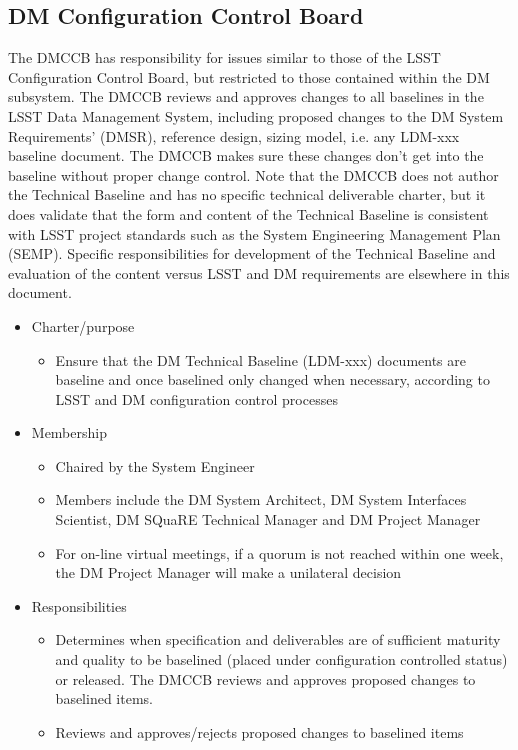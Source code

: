 \subsection{DM Configuration Control Board \label{sect:tct}}
The DMCCB has responsibility for issues similar to those of the LSST Configuration Control Board, but restricted to those contained within the DM subsystem. The DMCCB reviews and approves changes to all baselines in the LSST Data Management System, including proposed changes to the DM System Requirements' (DMSR), reference design, sizing model, i.e. any LDM-xxx baseline document.  The DMCCB makes sure these changes don't get into the baseline without proper change control.  Note that the DMCCB does not author the Technical Baseline and has no specific technical deliverable charter, but it does validate that the form and content of the Technical Baseline is consistent with LSST project standards such as the System Engineering Management Plan (SEMP).  Specific responsibilities for development of the Technical Baseline and evaluation of the content versus LSST and DM requirements are elsewhere in this document.
\begin{itemize}
\item Charter/purpose
	\begin{itemize}
	\item Ensure that the DM Technical Baseline (LDM-xxx) documents are baseline and once baselined only changed when necessary, according to LSST and DM configuration control processes
	\end{itemize}
\item Membership
	\begin{itemize}
	\item Chaired by the System Engineer
	\item Members include the DM System Architect, DM System Interfaces Scientist, DM SQuaRE Technical Manager and DM Project Manager
	\item For on-line virtual meetings, if a quorum is not reached within one week, the DM Project Manager will make a unilateral decision
	\end{itemize}
\item Responsibilities
	\begin{itemize}
	\item Determines when specification and deliverables are of sufficient maturity and quality to be baselined (placed under configuration controlled status) or released. The DMCCB reviews and approves proposed changes to baselined items.
	\item Reviews and approves/rejects proposed changes to baselined items
	\end{itemize}
\end{itemize}


